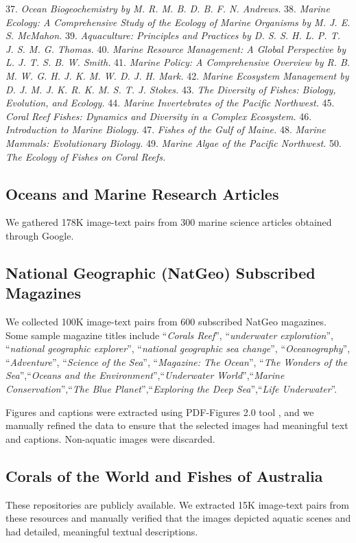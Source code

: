 37.	\textit{Ocean Biogeochemistry by M. R. M. B. D. B. F. N. Andrews.}
38.	\textit{Marine Ecology: A Comprehensive Study of the Ecology of Marine Organisms by M. J. E. S. McMahon.}
39.	\textit{Aquaculture: Principles and Practices by D. S. S. H. L. P. T. J. S. M. G. Thomas.}
40.	\textit{Marine Resource Management: A Global Perspective by L. J. T. S. B. W. Smith.}
41.	\textit{Marine Policy: A Comprehensive Overview by R. B. M. W. G. H. J. K. M. W. D. J. H. Mark.}
42.	\textit{Marine Ecosystem Management by D. J. M. J. K. R. K. M. S. T. J. Stokes.}
43.	\textit{The Diversity of Fishes: Biology, Evolution, and Ecology.}
44.	\textit{Marine Invertebrates of the Pacific Northwest.}
45.	\textit{Coral Reef Fishes: Dynamics and Diversity in a Complex Ecosystem.}
46.	\textit{Introduction to Marine Biology.}
47.	\textit{Fishes of the Gulf of Maine.}
48.	\textit{Marine Mammals: Evolutionary Biology.}
49.	\textit{Marine Algae of the Pacific Northwest.}
50.	\textit{The Ecology of Fishes on Coral Reefs.}


\subsection{Oceans and Marine Research Articles} 
We gathered 178K image-text pairs from 300 marine science articles obtained through Google.

\subsection{National Geographic (NatGeo) Subscribed Magazines} 
We collected 100K image-text pairs from 600 subscribed NatGeo magazines.
Some sample magazine titles include ``\textit{Corals Reef}'', ``\textit{underwater exploration}'', ``\textit{national geographic explorer}'', ``\textit{national geographic sea change}'', ``\textit{Oceanography}'', ``\textit{Adventure}'', ``\textit{Science of the Sea}'', ``\textit{Magazine: The Ocean}'', ``\textit{The Wonders of the Sea}'',``\textit{Oceans and the Environment}'',``\textit{Underwater World}'',``\textit{Marine Conservation}'',``\textit{The Blue Planet}'',``\textit{Exploring the Deep Sea}'',``\textit{Life Underwater}''.

Figures and captions were extracted using PDF-Figures 2.0 tool \cite{clark2016pdffigures}, and we manually refined the data to ensure that the selected images had meaningful text and captions. Non-aquatic images were discarded.


\subsection{Corals of the World and Fishes of Australia} 
These repositories are publicly available. We extracted 15K image-text pairs from these resources and manually verified that the images depicted aquatic scenes and had detailed, meaningful textual descriptions.


